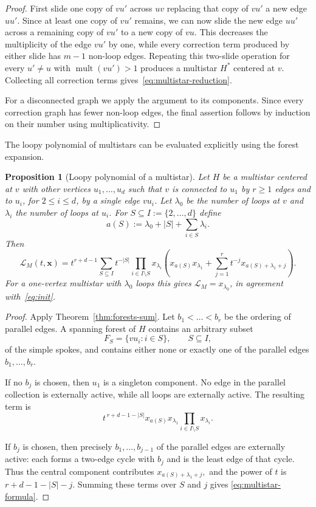 \documentclass[11pt]{article}
\theoremstyle{plain}
\newtheorem{proposition}[theorem]{Proposition}
\theoremstyle{definition}
\renewcommand{\mathcal}{\mathscr}
\newcommand{\LL}{\mathcal{L}}    %
\newcommand{\bx}{\mathbf{x}}
\newcommand{\mult}{\operatorname{mult}}
\numberwithin{equation}{section}
\begin{document}
\begin{proof}
First slide one copy of $vu'$ across $uv$ replacing that copy of $vu'$ a new edge $uu'$.
Since at least one copy of $vu'$ remains, we can now
slide the new edge $uu'$ across a remaining copy of $vu'$ to a new copy of $vu$.
This decreases the multiplicity of the edge $vu'$ by one, while every correction term produced
by either slide has $m-1$ non-loop edges.
%
Repeating this two-slide operation for every $u'\ne u$ with
$\mult(vu')>1$ produces a multistar $H^\ast$ centered at $v$.
Collecting all correction terms gives~\eqref{eq:multistar-reduction}.

For a disconnected graph we apply the argument to its components.
Since every correction graph has fewer non-loop edges, the final assertion follows
by induction on their number using multiplicativity.
\end{proof}

The loopy polynomial of multistars can be evaluated explicitly using the forest expansion.

\begin{proposition}[Loopy polynomial of a multistar]
\label{prop:multistar-formula}
Let $H$ be a multistar centered at $v$
with other vertices $u_1,\ldots,u_d$ such that
$v$ is connected to $u_1$ by $r\ge 1$ edges
and to $u_i$, for $2\leq i\leq d$, by a single edge $vu_i$.
Let $\lambda_0$ be the number of loops at $v$ and $\lambda_i$ the number of loops at $u_i$.  For $S\subseteq I:=\{2,\ldots,d\}$ define
\[
   a(S):=\lambda_0+|S|+\sum_{i\in S}\lambda_i.
\]
Then
\begin{equation}\label{eq:multistar-formula}
\LL_M(t,\bx)=t^{r+d-1}\sum_{S\subseteq I}t^{-|S|}
\prod_{i\in I\setminus S}x_{\lambda_i}
\left(x_{a(S)}x_{\lambda_1}+\sum_{j=1}^r t^{-j}x_{a(S)+\lambda_1+j}\right).
\end{equation}
For a one-vertex multistar with $\lambda_0$ loops this gives $\LL_M=x_{\lambda_0}$, in agreement with~\eqref{eq:init}.
\end{proposition}

\begin{proof}
  Apply Theorem~\ref{thm:forests-sum}.
  Let $b_1<\ldots<b_r$ be the ordering of parallel edges.
  A spanning forest of $H$ contains an arbitrary subset
\[
F_S=\{vu_i : i \in S\}, \qquad   S \subseteq I,
\]
of the simple spokes, and contains either none or exactly one of the parallel edges $b_1,\ldots,b_r$.

If no $b_j$ is chosen, then $u_1$ is a singleton component.
No edge in the parallel collection is externally active, while all loops are externally active.
The resulting term is
\[
 t^{\,r+d-1-|S|}
 x_{a(S)}x_{\lambda_1}
 \prod_{i\in I\setminus S}x_{\lambda_i}.
\]

If $b_j$ is chosen, then precisely
$  b_1,\ldots,b_{j-1}$
of the parallel edges are externally active: each forms a two-edge
cycle with $b_j$ and is the least edge of that cycle.
Thus the central component contributes
  $ x_{a(S)+\lambda_1+j},$
and the power of $t$ is  $r+d-1-|S|-j.$
%
Summing these terms over $S$ and $j$ gives
\eqref{eq:multistar-formula}.
\end{proof}
\end{document}

